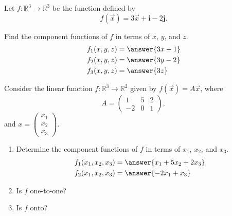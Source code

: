 \documentclass{ximera}
\begin{document}
\begin{problem}
Let $f:\mathbb{R}^3\rightarrow\mathbb{R}^3$ be the function defined by
\[
f(\vec{x}) = 3\vec{x} + \textbf{i} - 2\textbf{j}.
\]

Find the component functions of $f$ in terms of $x$, $y$, and $z$.
\begin{align*}
f_1(x,y,z) &= \answer{3x+1}\\
f_2(x,y,z) &= \answer{3y-2}\\
f_3(x,y,z) &= \answer{3z}
\end{align*}
\end{problem}

\begin{problem}
Consider the linear function $f:\mathbb{R}^3\rightarrow\mathbb{R}^2$ given by $f(\vec{x}) = A\vec{x}$, where
\[
A = \left(\begin{array}{ccc}
1&5&2\\
-2&0&1
\end{array}\right),
\]
and $x = \left(\begin{array}{c}x_1\\x_2\\x_3\end{array}\right)$.

\begin{enumerate}
\item Determine the component functions of $f$ in terms of $x_1$, $x_2$, and $x_3$.
\begin{align*}
f_1(x_1,x_2,x_3) &= \answer{x_1 + 5x_2 + 2x_3}\\
f_2(x_1,x_2,x_3) &= \answer{-2x_1 + x_3} 
\end{align*}
\item Is $f$ one-to-one?
\begin{multipleChoice}
\end{multipleChoice}
\item Is $f$ onto?
\begin{multipleChoice}
\end{multipleChoice}
\end{enumerate}
\end{problem}
\end{document}
